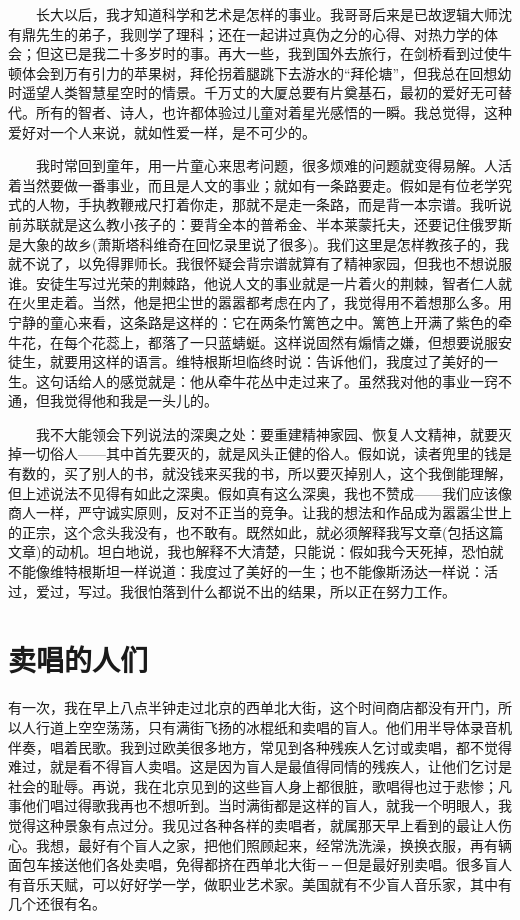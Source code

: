 　　长大以后，我才知道科学和艺术是怎样的事业。我哥哥后来是已故逻辑大师沈有鼎先生的弟子，我则学了理科；还在一起讲过真伪之分的心得、对热力学的体会；但这已是我二十多岁时的事。再大一些，我到国外去旅行，在剑桥看到过使牛顿体会到万有引力的苹果树，拜伦拐着腿跳下去游水的“拜伦塘”，但我总在回想幼时遥望人类智慧星空时的情景。千万丈的大厦总要有片奠基石，最初的爱好无可替代。所有的智者、诗人，也许都体验过儿童对着星光感悟的一瞬。我总觉得，这种爱好对一个人来说，就如性爱一样，是不可少的。 

　　我时常回到童年，用一片童心来思考问题，很多烦难的问题就变得易解。人活着当然要做一番事业，而且是人文的事业；就如有一条路要走。假如是有位老学究式的人物，手执教鞭戒尺打着你走，那就不是走一条路，而是背一本宗谱。我听说前苏联就是这么教小孩子的：要背全本的普希金、半本莱蒙托夫，还要记住俄罗斯是大象的故乡(萧斯塔科维奇在回忆录里说了很多)。我们这里是怎样教孩子的，我就不说了，以免得罪师长。我很怀疑会背宗谱就算有了精神家园，但我也不想说服谁。安徒生写过光荣的荆棘路，他说人文的事业就是一片着火的荆棘，智者仁人就在火里走着。当然，他是把尘世的嚣嚣都考虑在内了，我觉得用不着想那么多。用宁静的童心来看，这条路是这样的：它在两条竹篱笆之中。篱笆上开满了紫色的牵牛花，在每个花蕊上，都落了一只蓝蜻蜓。这样说固然有煽情之嫌，但想要说服安徒生，就要用这样的语言。维特根斯坦临终时说：告诉他们，我度过了美好的一生。这句话给人的感觉就是：他从牵牛花丛中走过来了。虽然我对他的事业一窍不通，但我觉得他和我是一头儿的。 

　　我不大能领会下列说法的深奥之处：要重建精神家园、恢复人文精神，就要灭掉一切俗人——其中首先要灭的，就是风头正健的俗人。假如说，读者兜里的钱是有数的，买了别人的书，就没钱来买我的书，所以要灭掉别人，这个我倒能理解，但上述说法不见得有如此之深奥。假如真有这么深奥，我也不赞成——我们应该像商人一样，严守诚实原则，反对不正当的竞争。让我的想法和作品成为嚣嚣尘世上的正宗，这个念头我没有，也不敢有。既然如此，就必须解释我写文章(包括这篇文章)的动机。坦白地说，我也解释不大清楚，只能说：假如我今天死掉，恐怕就不能像维特根斯坦一样说道：我度过了美好的一生；也不能像斯汤达一样说：活过，爱过，写过。我很怕落到什么都说不出的结果，所以正在努力工作。

\chapter{卖唱的人们}

有一次，我在早上八点半钟走过北京的西单北大街，这个时间商店都没有开门，所以人行道上空空荡荡，只有满街飞扬的冰棍纸和卖唱的盲人。他们用半导体录音机伴奏，唱着民歌。我到过欧美很多地方，常见到各种残疾人乞讨或卖唱，都不觉得难过，就是看不得盲人卖唱。这是因为盲人是最值得同情的残疾人，让他们乞讨是社会的耻辱。再说，我在北京见到的这些盲人身上都很脏，歌唱得也过于悲惨；凡事他们唱过得歌我再也不想听到。当时满街都是这样的盲人，就我一个明眼人，我觉得这种景象有点过分。我见过各种各样的卖唱者，就属那天早上看到的最让人伤心。我想，最好有个盲人之家，把他们照顾起来，经常洗洗澡，换换衣服，再有辆面包车接送他们各处卖唱，免得都挤在西单北大街－－但是最好别卖唱。很多盲人有音乐天赋，可以好好学一学，做职业艺术家。美国就有不少盲人音乐家，其中有几个还很有名。 


